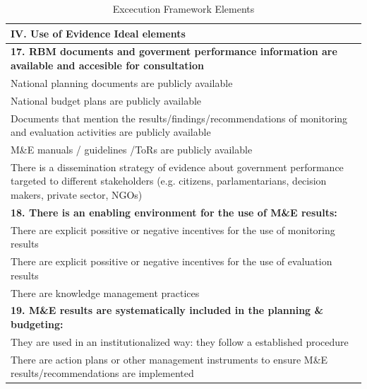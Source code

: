 \documentclass[
  10pt,
]{book}
\begin{document}
\begin{table}

\caption{\label{tab:unnamed-chunk-2}Excecution Framework Elements}
\centering
\begin{tabular}[t]{l}
\hline
IV. Use of Evidence Ideal elements\\
\hline
\multicolumn{1}{l}{\textbf{17. RBM documents and goverment performance information are available and accesible for consultation}}\\
\hline
\hspace{1em}National planning documents are publicly available\\
\hline
\hspace{1em}National budget plans are publicly available\\
\hline
\hspace{1em}Documents that mention the results/findings/recommendations of monitoring and evaluation activities are publicly available\\
\hline
\hspace{1em}M\&E manuals / guidelines /ToRs are publicly available\\
\hline
\hspace{1em}There is a dissemination strategy of evidence about government performance targeted to different stakeholders (e.g. citizens, parlamentarians, decision makers, private sector, NGOs)\\
\hline
\multicolumn{1}{l}{\textbf{18. There is an enabling environment for the use of M\&E results:}}\\
\hline
\hspace{1em}There are explicit possitive or negative incentives for the use of monitoring results\\
\hline
\hspace{1em}There are explicit possitive or negative incentives for the use of evaluation results\\
\hline
\hspace{1em}There are knowledge management practices\\
\hline
\multicolumn{1}{l}{\textbf{19. M\&E results are systematically included in the planning \& budgeting:}}\\
\hline
\hspace{1em}They are used in an institutionalized way: they follow a established procedure\\
\hline
\hspace{1em}There are action plans or other management instruments to ensure M\&E results/recommendations are implemented\\

\end{tabular}
\end{table}
\end{document}
